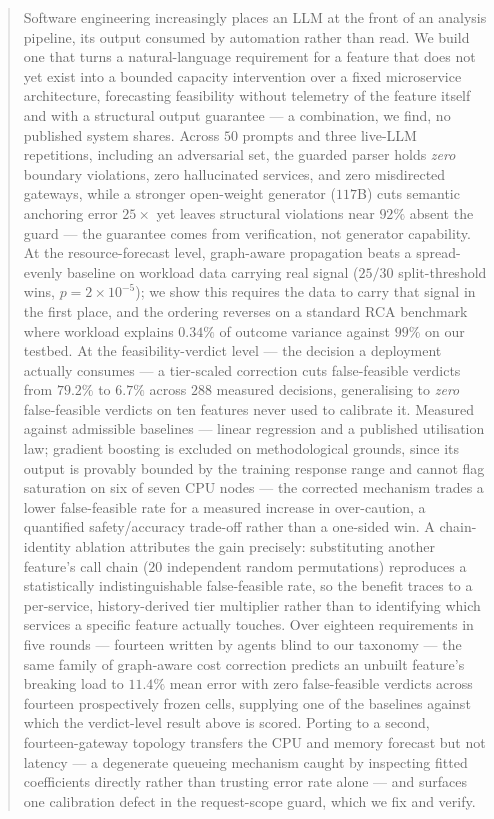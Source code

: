 \documentclass[journal, 10pt]{IEEEtran}
\begin{document}
\begin{abstract}
Software engineering increasingly places an LLM at the front of an analysis
pipeline, its output consumed by automation rather than read. We build one that
turns a natural-language requirement for a feature that does not yet exist into
a bounded capacity intervention over a fixed microservice architecture,
forecasting feasibility without telemetry of the feature itself and with a
structural output guarantee --- a combination, we find, no published system
shares. Across $50$ prompts and three live-LLM repetitions, including an
adversarial set, the guarded parser holds \emph{zero} boundary violations, zero
hallucinated services, and zero misdirected gateways, while a stronger
open-weight generator ($117$B) cuts semantic anchoring error $25{\times}$ yet
leaves structural violations near $92\%$ absent the guard --- the guarantee
comes from verification, not generator capability. At the resource-forecast
level, graph-aware propagation beats a spread-evenly baseline on workload data
carrying real signal ($25/30$ split-threshold wins, $p{=}2{\times}10^{-5}$);
we show this requires the data to carry that signal in the first place, and the
ordering reverses on a standard RCA benchmark where workload explains $0.34\%$
of outcome variance against $99\%$ on our testbed. At the feasibility-verdict
level --- the decision a deployment actually consumes --- a tier-scaled
correction cuts false-feasible verdicts from $79.2\%$ to $6.7\%$ across $288$
measured decisions, generalising to \emph{zero} false-feasible verdicts on ten
features never used to calibrate it. Measured against admissible baselines ---
linear regression and a published utilisation law; gradient boosting is
excluded on methodological grounds, since its output is provably bounded by the
training response range and cannot flag saturation on six of seven CPU nodes
--- the corrected mechanism trades a lower false-feasible rate for a measured
increase in over-caution, a quantified safety/accuracy trade-off rather than a
one-sided win. A chain-identity ablation attributes the gain precisely:
substituting another feature's call chain ($20$ independent random
permutations) reproduces a statistically indistinguishable false-feasible rate,
so the benefit traces to a per-service, history-derived tier multiplier rather
than to identifying which services a specific feature actually touches. Over
eighteen requirements in five rounds --- fourteen written by agents blind to our
taxonomy --- the same family of graph-aware cost correction predicts an unbuilt
feature's breaking load to $11.4\%$ mean error with zero false-feasible verdicts
across fourteen prospectively frozen cells, supplying one of the baselines
against which the verdict-level result above is scored. Porting to a second,
fourteen-gateway topology transfers the CPU and memory forecast but not latency
--- a degenerate queueing mechanism caught by inspecting fitted coefficients
directly rather than trusting error rate alone --- and surfaces one calibration
defect in the request-scope guard, which we fix and verify.
\end{abstract}
\end{document}
